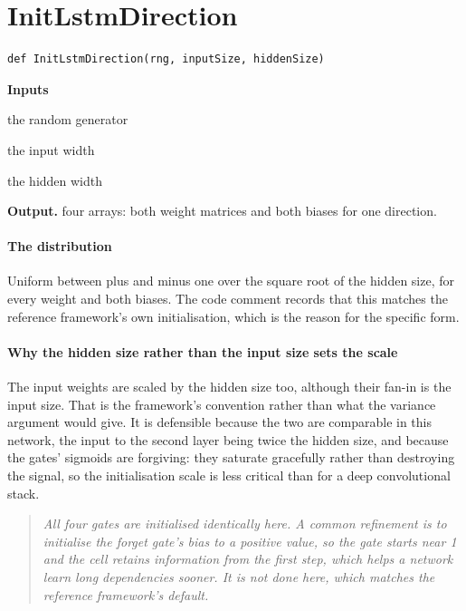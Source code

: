 \section{InitLstmDirection}
\begin{lstlisting}[style=sig]
def InitLstmDirection(rng, inputSize, hiddenSize)
\end{lstlisting}

\noindent\textbf{Inputs}
\begin{description}[leftmargin=2.2em,style=nextline,font=\normalfont\ttfamily]\setlength\itemsep{1pt}
  \item[{rng}] \normalfont the random generator
  \item[{inputSize}] \normalfont the input width
  \item[{hiddenSize}] \normalfont the hidden width
\end{description}

\noindent\textbf{Output.} four arrays: both weight matrices and both biases for one direction.


\paragraph{The distribution}
Uniform between plus and minus one over the square root of the hidden size, for every weight and both biases. The code comment records that this matches the reference framework's own initialisation, which is the reason for the specific form.


\paragraph{Why the hidden size rather than the input size sets the scale}
The input weights are scaled by the hidden size too, although their fan-in is the input size. That is the framework's convention rather than what the variance argument would give. It is defensible because the two are comparable in this network, the input to the second layer being twice the hidden size, and because the gates' sigmoids are forgiving: they saturate gracefully rather than destroying the signal, so the initialisation scale is less critical than for a deep convolutional stack.


\begin{quote}\small\itshape All four gates are initialised identically here. A common refinement is to initialise the forget gate's bias to a positive value, so the gate starts near 1 and the cell retains information from the first step, which helps a network learn long dependencies sooner. It is not done here, which matches the reference framework's default.\end{quote}

